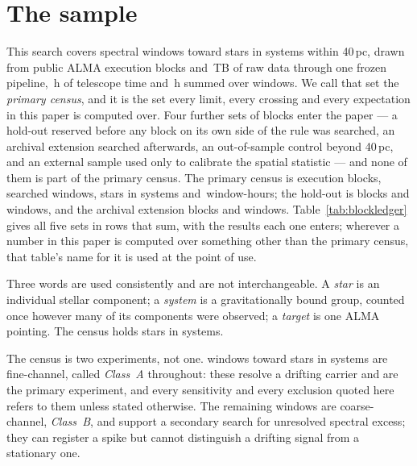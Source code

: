 \section{The sample}
\label{sec:sample}

This search covers \NWindows{} spectral windows toward \NStars{}
stars in \NSystems{} systems within 40\,pc, drawn from \NEB{}
public ALMA execution blocks and \TotalDataTB\,TB of raw data through one
frozen pipeline, \StTelHours\,h of telescope time and \LdgCensusHours\,h
summed over windows. We call that set the
\emph{primary census}, and it is the set every limit, every crossing and
every expectation in this paper is computed over. Four further sets of blocks
enter the paper --- a hold-out reserved before any block on its own side of the rule was
searched, an
archival extension searched afterwards, an out-of-sample control beyond
40\,pc, and an external sample used only to calibrate the spatial statistic
--- and none of them is part of the primary census.
The primary census is \LdgCensusEB{} execution blocks, \LdgCensusWin{}
searched windows, \LdgCensusStars{} stars in \LdgCensusSys{} systems and
\LdgCensusHours\,window-hours; the hold-out is \LdgHoldEB{} blocks and
\LdgHoldWin{} windows, and the archival extension \LdgExtEB{} blocks and
\LdgExtWin{} windows.
Table~\ref{tab:blockledger} gives all five sets in rows that sum, with the
results each one enters; wherever a number in this paper is computed over
something other than the primary census, that table's name for it is used at
the point of use.

Three words are used consistently and are not interchangeable. A \emph{star}
is an individual stellar component; a \emph{system} is a gravitationally
bound group, counted once however many of its components were observed; a
\emph{target} is one ALMA pointing. The census holds \NStars{} stars
in \NSystems{} systems.

The census is two experiments, not one. \NWinA{} windows toward
\LdgClassAStars{} stars in \NSysClassA{} systems are fine-channel, called
\emph{Class~A} throughout: these resolve a drifting carrier and are the
primary experiment, and every sensitivity and every exclusion quoted here
refers to them unless stated otherwise. The remaining \NWinB{} windows
are coarse-channel, \emph{Class~B}, and support a secondary search for
unresolved spectral excess; they can register a spike but cannot distinguish
a drifting signal from a stationary one.

